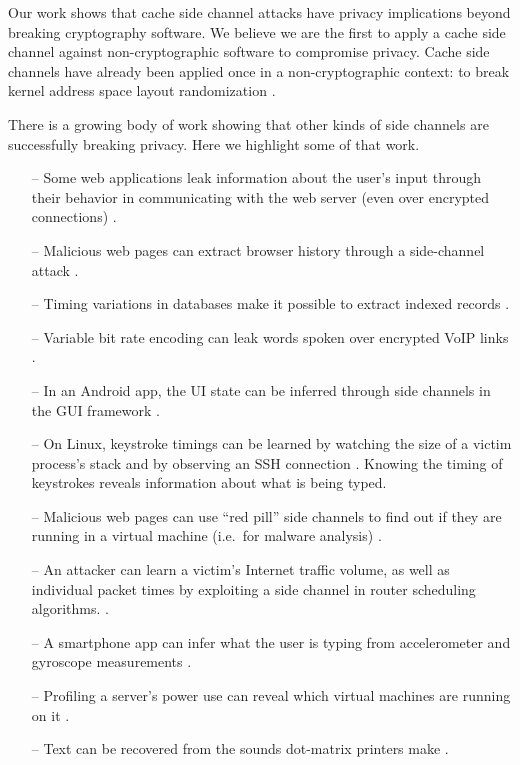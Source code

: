 \documentclass[letterpaper,twocolumn,10pt]{article}
\begin{document}
Our work shows that cache side channel attacks have privacy implications beyond
breaking cryptography software. We believe we are the first to apply a cache
side channel against non-cryptographic software to compromise privacy. Cache
side channels have already been applied once in a non-cryptographic context: to
break kernel address space layout randomization \cite{hund2013practical}.

There is a growing body of work showing that other kinds of side channels are
successfully breaking privacy. Here we highlight some of that work.

\begin{itemize}
    \item[--] Some web applications leak information about the user's input through
          their behavior in communicating with the web server (even over
          encrypted connections) \cite{bortz2007exposing, chen2010side}.
    \item[--] Malicious web pages can extract browser history through a side-channel attack
          \cite{weinberg2011still}. 
    \item[--] Timing variations in databases make it possible to extract
          indexed records \cite{futoransky2007nd2db}.
    \item[--] Variable bit rate encoding can leak words spoken over encrypted
        VoIP links \cite{white2011phonotactic}.
    \item[--] In an Android app, the UI state can be inferred through side channels
          in the GUI framework \cite{chen2014peeking}.
    \item[--] On Linux, keystroke timings can be learned by watching the size of
          a victim process's stack \cite{zhang2009peeping} and by observing an
          SSH connection \cite{song2001timing}. Knowing the timing of keystrokes
          reveals information about what is being typed.
    \item[--] Malicious web pages can use ``red pill'' side channels to find out if
          they are running in a virtual machine (i.e.\ for malware analysis)
          \cite{ho2014tick}.
    \item[--] An attacker can learn a victim's Internet traffic volume, as well as
          individual packet times by exploiting a side channel in router
          scheduling algorithms. \cite{kadloor2010low}.
    \item[--] A smartphone app can infer what the user is typing from accelerometer
          and gyroscope measurements \cite{owusu2012accessory,
          cai2012practicality}.
    \item[--] Profiling a server's power use can reveal which virtual machines
        are running on it \cite{hlavacs2011energy}.
    \item[--] Text can be recovered from the sounds dot-matrix printers make
          \cite{backes2010acoustic}.
\end{itemize}
\end{document}
